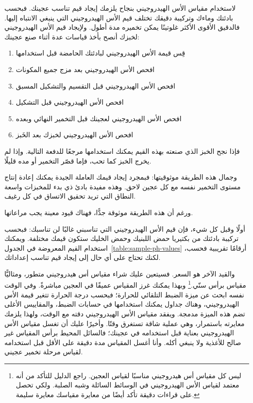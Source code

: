 لاستخدام مقياس الأس الهيدروجيني بنجاح يلزمك إيجاد قيم تناسب عجينك. فبحسب بادئتك وماءك وتركيبة دقيقك تختلف قيم الأس الهيدروجيني التي ينبغي الانتباه إليها. فالدقيق الأقوى الأكثر غلوتينًا يمكن تخميره مدة أطول. ولإيجاد قيم الأس الهيدروجيني لخبزك أنصح بأخذ قياسات عدة أثناء صنع عجينك:

\begin{enumerate}
  \item قِس قيمة الأس الهيدروجيني لبادئتك الحامضة قبل استخدامها
  \item افحص الأس الهيدروجيني بعد مزج جميع المكونات
  \item افحص الأس الهيدروجيني قبل التقسيم والتشكيل المسبق
  \item افحص الأس الهيدروجيني قبل التشكيل
  \item افحص الأس الهيدروجيني لعجينك قبل التخمير النهائي وبعده
  \item افحص الأس الهيدروجيني لخبزك بعد الخَبز
\end{enumerate}

فإذا نجح الخبز الذي صنعته بهذه القيم يمكنك استخدامها مرجعًا للدفعة التالية. وإذا لم يخرج الخبز كما تحب، فإما قصّر التخمير أو مده قليلًا.

\begin{table}[htb]
    \centering
        \caption[الأس الهيدروجيني للعجين أثناء تحضير الخبز]{قيم أس هيدروجيني نموذجية للنقاط الفاصلة المختلفة في عملية الخبز الحامض عندي.}
        \label{table:sample-ph-values}
\end{table}

وجمال هذه الطريقة موثوقيتها: فبمجرد إيجاد قيمك العاملة الجيدة يمكنك إعادة إنتاج مستوى التخمير نفسه مع كل عجين لاحق. وهذه مفيدة بادئ ذي بدء للمخبزات واسعة النطاق التي تريد تحقيق الاتساق في كل رغيف.

ورغم أن هذه الطريقة موثوقة جدًّا، فهناك قيود معينة يجب مراعاتها.

أولًا وقبل كل شيء، فإن قيم الأس الهيدروجيني التي تناسبني غالبًا لن تناسبك: فبحسب تركيبة بادئتك من بكتيريا حمض اللبنيك وحمض الخليك ستكون قيمك مختلفة. ويمكنك استخدام القيم المعروضة في الجدول~\ref{table:sample-ph-values} أرقامًا تقريبية فحسب، لكنك تحتاج على أي حال إلى إيجاد قيم تناسب إعداداتك.

والقيد الآخر هو السعر. فسيتعين عليك شراء مقياس أس هيدروجيني متطور، ومثاليًّا مقياس برأس سنّي.\footnote{ليس كل مقياس أس هيدروجيني مناسبًا لقياس العجين. راجع الدليل للتأكد من أنه معتمد لقياس الأس الهيدروجيني في الوسائط السائلة وشبه الصلبة. ولكي تحصل على قراءات دقيقة تأكد أيضًا من معايرة مقياسك معايرة سليمة.} وبهذا يمكنك غرز المقياس عميقًا في العجين مباشرةً. وفي الوقت نفسه ابحث عن ميزة الضبط التلقائي للحرارة؛ فبحسب درجة الحرارة تتغير قيمة الأس الهيدروجيني، وهناك جداول يمكنك استخدامها في حسابات الضبط، والمقاييس الأغلى تضم هذه الميزة مدمجة. ويفقد مقياس الأس الهيدروجيني دقته مع الوقت، ولهذا يلزمك معايرته باستمرار، وهي عملية شاقة تستغرق وقتًا. وأخيرًا عليك أن تغسل مقياس الأس الهيدروجيني بعناية قبل استخدامه في عجينك؛ فالسائل المحيط برأس المقياس غير صالح للأغذية ولا ينبغي أكله. وأنا أغسل المقياس مدة دقيقة على الأقل قبل استخدامه لقياس مرحلة تخمير عجيني.

